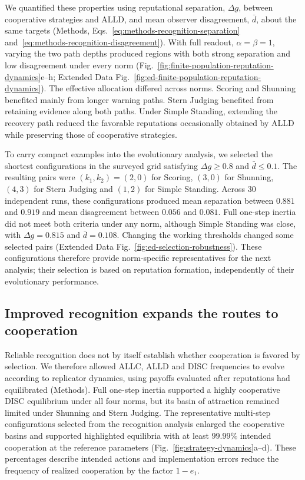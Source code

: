 \documentclass[fleqn,10pt]{wlscirep}
\begin{document}
We quantified these properties using reputational separation, $\Delta g$, between cooperative strategies and ALLD, and mean observer disagreement, $\bar d$, about the same targets (Methods, Eqs.~\eqref{eq:methods-recognition-separation} and~\eqref{eq:methods-recognition-disagreement}). With full readout, $\alpha=\beta=1$, varying the two path depths produced regions with both strong separation and low disagreement under every norm (Fig.~\ref{fig:finite-population-reputation-dynamics}e--h; Extended Data Fig.~\ref{fig:ed-finite-population-reputation-dynamics}). The effective allocation differed across norms. Scoring and Shunning benefited mainly from longer warning paths. Stern Judging benefited from retaining evidence along both paths. Under Simple Standing, extending the recovery path reduced the favorable reputations occasionally obtained by ALLD while preserving those of cooperative strategies.

To carry compact examples into the evolutionary analysis, we selected the shortest configurations in the surveyed grid satisfying $\Delta g\geq0.8$ and $\bar d\leq0.1$. The resulting pairs were $(k_1,k_2)=(2,0)$ for Scoring, $(3,0)$ for Shunning, $(4,3)$ for Stern Judging and $(1,2)$ for Simple Standing. Across 30 independent runs, these configurations produced mean separation between $0.881$ and $0.919$ and mean disagreement between $0.056$ and $0.081$. Full one-step inertia did not meet both criteria under any norm, although Simple Standing was close, with $\Delta g=0.815$ and $\bar d=0.108$. Changing the working thresholds changed some selected pairs (Extended Data Fig.~\ref{fig:ed-selection-robustness}). These configurations therefore provide norm-specific representatives for the next analysis; their selection is based on reputation formation, independently of their evolutionary performance.


\subsection*{Improved recognition expands the routes to cooperation}
\label{sec:results-strategy-dynamics}

Reliable recognition does not by itself establish whether cooperation is favored by selection. We therefore allowed ALLC, ALLD and DISC frequencies to evolve according to replicator dynamics, using payoffs evaluated after reputations had equilibrated (Methods). Full one-step inertia supported a highly cooperative DISC equilibrium under all four norms, but its basin of attraction remained limited under Shunning and Stern Judging. The representative multi-step configurations selected from the recognition analysis enlarged the cooperative basins and supported highlighted equilibria with at least $99.99\%$ intended cooperation at the reference parameters (Fig.~\ref{fig:strategy-dynamics}a--d). These percentages describe intended actions and implementation errors reduce the frequency of realized cooperation by the factor $1-e_1$.
\end{document}
